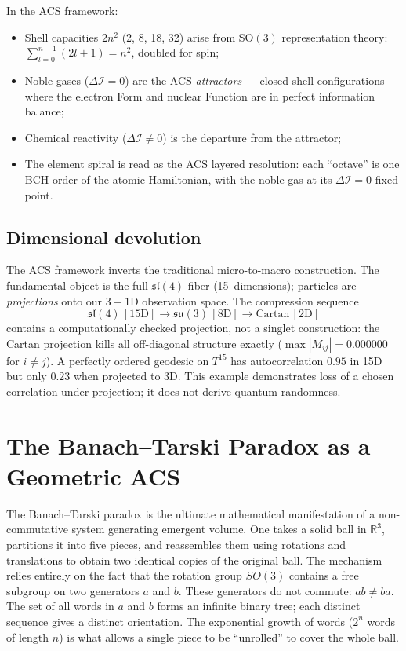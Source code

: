 \documentclass[11pt,a4paper]{article}
\theoremstyle{plain}
\theoremstyle{definition}
\theoremstyle{remark}
\newcommand{\DI}{\Delta\mathcal{I}}
\begin{document}
In the ACS framework:
\begin{itemize}[noitemsep]
  \item Shell capacities $2n^2$ (2, 8, 18, 32) arise from $\mathrm{SO}(3)$
    representation theory: $\sum_{l=0}^{n-1} (2l+1) = n^2$, doubled for spin;
  \item Noble gases ($\DI = 0$) are the ACS \emph{attractors} --- closed-shell
    configurations where the electron Form and nuclear Function are in
    perfect information balance;
  \item Chemical reactivity ($\DI \neq 0$) is the departure from the attractor;
  \item The element spiral is read as the ACS layered resolution: each ``octave'' is
    one BCH order of the atomic Hamiltonian, with the noble gas at its
    $\DI = 0$ fixed point.
\end{itemize}

\subsection{Dimensional devolution}

The ACS framework inverts the traditional micro-to-macro construction.
The fundamental object is the full $\mathfrak{sl}(4)$ fiber (15~dimensions);
particles are \emph{projections} onto our $3{+}1$D observation space.
The compression sequence
\[
  \mathfrak{sl}(4)\,[15\mathrm{D}] \to \mathfrak{su}(3)\,[8\mathrm{D}]
  \to \mathrm{Cartan}\,[2\mathrm{D}]
\]
contains a computationally checked projection, not a singlet construction: the Cartan projection kills all
off-diagonal structure exactly ($\max|M_{ij}| = 0.000000$ for $i \neq j$).
A perfectly ordered geodesic on $T^{15}$ has autocorrelation $0.95$ in 15D
but only $0.23$ when projected to 3D.  This example demonstrates loss of a chosen correlation under projection; it does not derive quantum randomness.



\section{The Banach--Tarski Paradox as a Geometric ACS}
\label{sec:BT}

The Banach--Tarski paradox is the ultimate mathematical manifestation of a non-commutative
system generating emergent volume.  One takes a solid ball in $\mathbb{R}^3$, partitions it
into five pieces, and reassembles them using rotations and translations to obtain two
identical copies of the original ball.  The mechanism relies entirely on the fact that
the rotation group $SO(3)$ contains a free subgroup on two generators $a$ and $b$.
These generators do not commute: $ab \neq ba$.  The set of all words in $a$ and $b$ forms
an infinite binary tree; each distinct sequence gives a distinct orientation.
The exponential growth of words ($2^n$ words of length $n$) is what allows a single piece
to be ``unrolled'' to cover the whole ball.
\end{document}
